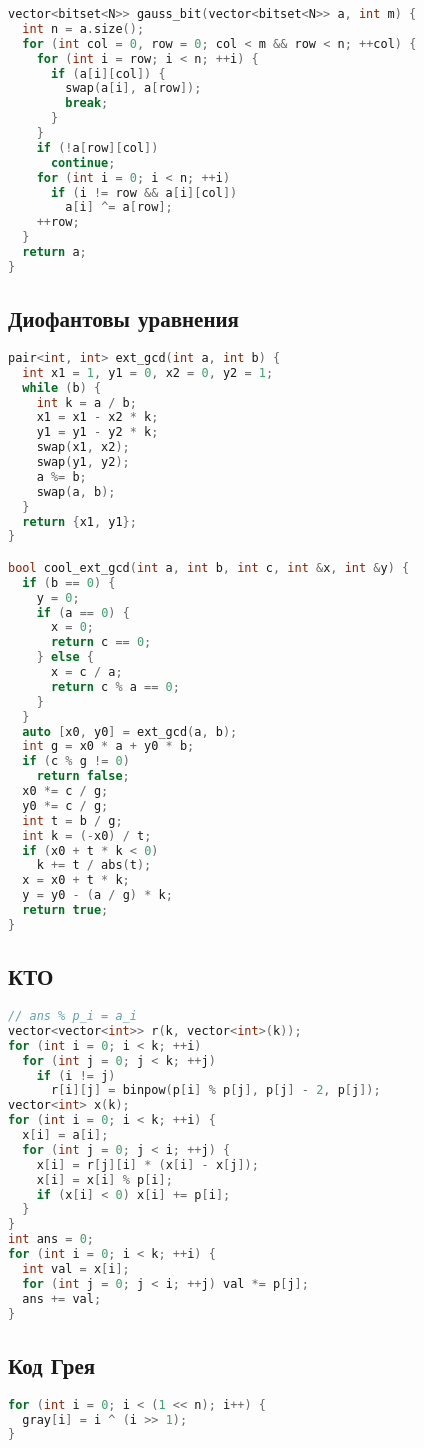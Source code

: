 \documentclass[9pt,a4paper,landscape,twosided]{extarticle}
\begin{document}
\begin{multicols*}{3}
\begin{lstlisting}[language=C++]
vector<bitset<N>> gauss_bit(vector<bitset<N>> a, int m) {
  int n = a.size();
  for (int col = 0, row = 0; col < m && row < n; ++col) {
    for (int i = row; i < n; ++i) {
      if (a[i][col]) {
        swap(a[i], a[row]);
        break;
      }
    }
    if (!a[row][col])
      continue;
    for (int i = 0; i < n; ++i)
      if (i != row && a[i][col])
        a[i] ^= a[row];
    ++row;
  }
  return a;
}
\end{lstlisting}

\subsection{Диофантовы уравнения}
\begin{lstlisting}[language=C++]
pair<int, int> ext_gcd(int a, int b) {
  int x1 = 1, y1 = 0, x2 = 0, y2 = 1;
  while (b) {
    int k = a / b;
    x1 = x1 - x2 * k;
    y1 = y1 - y2 * k;
    swap(x1, x2);
    swap(y1, y2);
    a %= b;
    swap(a, b);
  }
  return {x1, y1};
}

bool cool_ext_gcd(int a, int b, int c, int &x, int &y) {
  if (b == 0) {
    y = 0;
    if (a == 0) {
      x = 0;
      return c == 0;
    } else {
      x = c / a;
      return c % a == 0;
    }
  }
  auto [x0, y0] = ext_gcd(a, b);
  int g = x0 * a + y0 * b;
  if (c % g != 0)
    return false;
  x0 *= c / g;
  y0 *= c / g;
  int t = b / g;
  int k = (-x0) / t;
  if (x0 + t * k < 0)
    k += t / abs(t);
  x = x0 + t * k;
  y = y0 - (a / g) * k;
  return true;
}
\end{lstlisting}

\subsection{КТО}
\begin{lstlisting}[language=C++]
// ans % p_i = a_i
vector<vector<int>> r(k, vector<int>(k));
for (int i = 0; i < k; ++i)
  for (int j = 0; j < k; ++j)
    if (i != j)
      r[i][j] = binpow(p[i] % p[j], p[j] - 2, p[j]);
vector<int> x(k);
for (int i = 0; i < k; ++i) {
  x[i] = a[i];
  for (int j = 0; j < i; ++j) {
    x[i] = r[j][i] * (x[i] - x[j]);
    x[i] = x[i] % p[i];
    if (x[i] < 0) x[i] += p[i];
  }
}
int ans = 0;
for (int i = 0; i < k; ++i) {
  int val = x[i];
  for (int j = 0; j < i; ++j) val *= p[j];
  ans += val;
}
\end{lstlisting}

\subsection{Код Грея}
\begin{lstlisting}[language=C++]
for (int i = 0; i < (1 << n); i++) {
  gray[i] = i ^ (i >> 1);
}
\end{lstlisting}


\end{multicols*}
\end{document}
